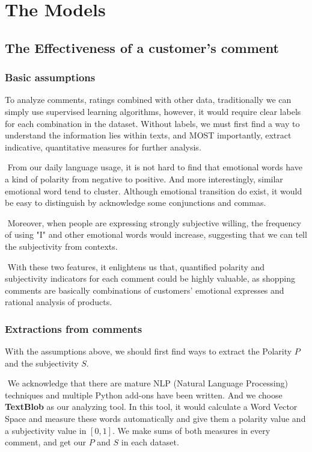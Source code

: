 \documentclass[12pt]{article}  %
\begin{document}
\section{The Models}

\subsection{The Effectiveness of a customer's comment}

\subsubsection{Basic assumptions}

To analyze comments, ratings combined with other data, traditionally we can simply use supervised learning algorithms, however, it would require clear labels for each combination in the dataset. Without labels, we must first find a way to understand the information lies within texts, and MOST importantly, extract indicative, quantitative measures for further analysis.

​		From our daily language usage, it is not hard to find that emotional words have a kind of polarity from negative to positive. And more interestingly, similar emotional word tend to cluster. Although emotional transition do exist, it would be easy to distinguish by acknowledge some conjunctions and commas.

​		Moreover, when people are expressing strongly subjective willing, the frequency of using "I" and other emotional words would increase, suggesting that we can tell the subjectivity from contexts.

​		With these two features, it enlightens us that, quantified polarity and subjectivity indicators for each comment could be highly valuable, as shopping comments are basically combinations of customers' emotional expresses and rational analysis of products.

\subsubsection{Extractions from comments}

\label{sec:Extractions from comments}

With the assumptions above, we should first find ways to extract the Polarity $P$ and the subjectivity $S$.

​		We acknowledge that there are mature NLP (Natural Language Processing) techniques and multiple Python add-ons have been written. And we choose \textbf{TextBlob} as our analyzing tool. In this tool, it would calculate a Word Vector Space and measure these words automatically and give them a polarity value and a subjectivity value in $[0,1]$. We make sums of both measures in every comment, and get our $P$ and $S$ in each dataset.
\end{document}

